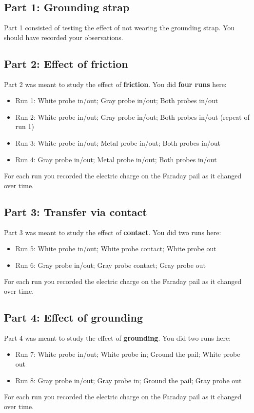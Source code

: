 \subsection{Part 1: Grounding strap}
Part 1 consisted of testing the effect of not wearing the grounding strap. You should have recorded your observations.
\subsection{Part 2: Effect of friction}
Part 2 was meant to study the effect of \textbf{friction}. You did \textbf{four runs} here:
\begin{itemize}
	\item Run 1: White probe in/out; Gray probe in/out; Both probes in/out
	\item Run 2: White probe in/out; Gray probe in/out; Both probes in/out (repeat of run 1)
	\item Run 3: White probe in/out; Metal probe in/out; Both probes in/out
	\item Run 4: Gray probe in/out; Metal probe in/out; Both probes in/out
\end{itemize}
For each run you recorded the electric charge on the Faraday pail as it changed over time.
\subsection{Part 3: Transfer via contact}
Part 3 was meant to study the effect of \textbf{contact}. You did two runs here:
\begin{itemize}
	\item Run 5: White probe in/out; White probe contact; White probe out
	\item Run 6: Gray probe in/out; Gray probe contact; Gray probe out
\end{itemize}
For each run you recorded the electric charge on the Faraday pail as it changed over time.
\subsection{Part 4: Effect of grounding}
Part 4 was meant to study the effect of \textbf{grounding}. You did two runs here:
\begin{itemize}
	\item Run 7: White probe in/out; White probe in; Ground the pail; White probe out
	\item Run 8: Gray probe in/out; Gray probe in; Ground the pail; Gray probe out
\end{itemize}
For each run you recorded the electric charge on the Faraday pail as it changed over time.
